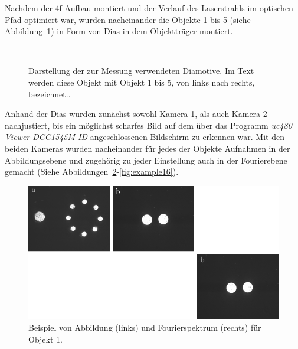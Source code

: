 \clearpage


Nachdem der 4f-Aufbau montiert und der Verlauf des Laserstrahls im optischen Pfad optimiert war, wurden nacheinander die Objekte 1 bis 5 (siehe Abbildung~\ref{fig:Objekte-aus-Anleitungsheft}) in Form von Dias in dem Objektträger montiert.

\begin{figure}[h]
	\centering
	~~
	~~
	~~
	~~
	\caption[Die zur Messung verwendeten Diamotive]{
		Darstellung der zur Messung verwendeten Diamotive. Im Text werden diese Objekt mit Objekt 1 bis 5, von links nach rechts, bezeichnet..
	}
	\label{fig:Objekte-aus-Anleitungsheft}
\end{figure}

Anhand der Dias wurden zunächst sowohl Kamera 1, als auch Kamera 2 nachjustiert, bis ein möglichst scharfes Bild auf dem über das Programm \textit{uc480 Viewer-DCC1545M-ID} angeschlossenen Bildschirm zu erkennen war. Mit den beiden Kameras wurden nacheinander für jedes der Objekte Aufnahmen in der Abbildungsebene und zugehörig zu jeder Einstellung auch in der Fourierebene gemacht (Siehe Abbildungen~\ref{fig:example1}-\ref{fig:example16}). 





\begin{figure}[h]
	\centering
	\includegraphics{images/ergebniss_ex1/abb.pdf}
	\caption{
		Beispiel von Abbildung (links) und Fourierspektrum (rechts) für Objekt 1.
	}
	\label{fig:example1}
\end{figure}

